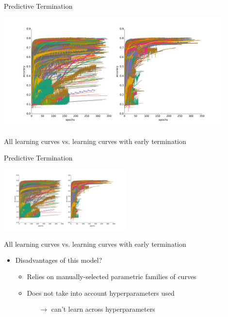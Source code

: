 \begin{frame}{Predictive Termination}
\vspace*{-0.2cm}
{
\begin{center}
\includegraphics[width=0.9\textwidth]{../w07_hpo_speedup/images/learningcurve/learning_curve_tuning.jpg}

All learning curves vs. learning curves with early termination
\end{center}
}




\end{frame}
\begin{frame}{Predictive Termination}

{
\begin{center}
\includegraphics[width=0.5\textwidth]{../w07_hpo_speedup/images/learningcurve/learning_curve_tuning.jpg}

All learning curves vs. learning curves with early termination
\end{center}
}
\begin{itemize}
	\item Disadvantages of this model?
\pause
	\begin{itemize}
		\item Relies on manually-selected parametric families of curves
		\item Does not take into account hyperparameters used 
		\begin{itemize}
			\item[$\rightarrow$] can't learn across hyperparameters
		\end{itemize}
	\end{itemize}
\end{itemize}

\end{frame}

